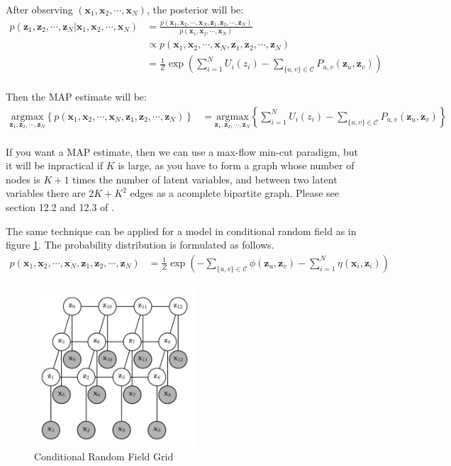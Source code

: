 \documentclass[a4]{article}
\begin{document}
After observing $(\bm{x}_1, \bm{x}_2, \cdots, \bm{x}_N)$, the posterior will be:
\begin{equation}
\begin{aligned}
    p( \bm{z}_1, \bm{z}_2, \cdots, \bm{z}_N | \bm{x}_1, \bm{x}_2, \cdots, \bm{x}_N )
&= 
    \frac{p( \bm{x}_1, \bm{x}_2, \cdots, \bm{x}_N , \bm{z}_1, \bm{z}_2, \cdots, \bm{z}_N ) }
         {p( \bm{x}_1, \bm{x}_2, \cdots, \bm{x}_N ) }\\
&\propto
    p( \bm{x}_1, \bm{x}_2, \cdots, \bm{x}_N , \bm{z}_1, \bm{z}_2, \cdots, \bm{z}_N )\\
&= 
    \frac{1}{Z}\exp\left(
    \sum_{i=1}^N U_i(z_i)
     - \sum_{\{u,v\}\in \mathcal{C}} P_{u,v}\left(\bm{z}_u, \bm{z}_v\right)\right)\\
\end{aligned}
\end{equation}

Then the MAP estimate will be:
\begin{equation}
\begin{aligned}
\underset{\bm{z}_1, \bm{z}_2, \cdots, \bm{z}_N}{\mathrm{argmax}}
\left\{
    p(\bm{x}_1, \bm{x}_2, \cdots, \bm{x}_N, \bm{z}_1, \bm{z}_2, \cdots, \bm{z}_N)
\right\}
&=
\underset{\bm{z}_1, \bm{z}_2, \cdots, \bm{z}_N}{\mathrm{argmax}}
\left\{
    \sum_{i=1}^N U_i(z_i)
     - \sum_{\{u,v\}\in \mathcal{C}} P_{u,v}\left(\bm{z}_u, \bm{z}_v\right)
\right\}\\
\end{aligned}
\end{equation}

If you want a MAP estimate, then we can use a max-flow min-cut paradigm, but it will be inpractical if $K$ is large, as 
you have to form a graph whose number of nodes is $K+1$ times the number of latent variables, and between two latent variables
there are $2K + K^2$ edges as a acomplete bipartite graph.
Please see section 12.2 and 12.3 of \cite{prince_2012}.

The same technique can be applied for a model in conditional random field as in figure \ref{fig:grid_crf}.
The probability distribution is formulated as follows.
\begin{equation}
\begin{aligned}
    p(\bm{x}_1, \bm{x}_2, \cdots, \bm{x}_N, \bm{z}_1, \bm{z}_2, \cdots, \bm{z}_N)
&=
    \frac{1}{Z}\exp\left(
     - \sum_{\{u,v\}\in \mathcal{C}} \phi\left(\bm{z}_u, \bm{z}_v\right)
     - \sum_{i=1}^N \eta\left(\bm{x}_i, \bm{z}_i\right)\right)\\
\end{aligned}
\end{equation}


\begin{figure}[!htb]
\centering
\includegraphics[width=6cm]{grid_crf.png}
\caption{Conditional Random Field Grid}
\label{fig:grid_crf}
\end{figure}


{}

\end{document}
